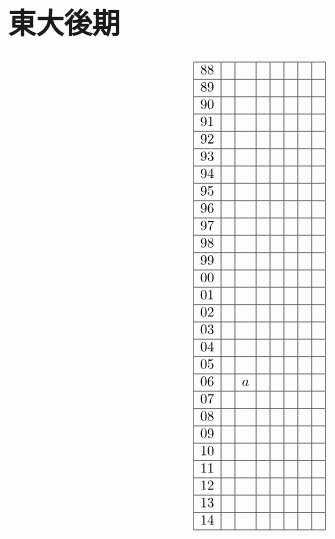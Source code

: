 \documentclass[a4j]{jarticle}
\begin{document}
\section{東大後期}
     \begin{align*}
          \begin{array}{|c|c|c|c|c|c|c|c|} \hline
          88&&&&&&& \\ \hline
          89&&&&&&& \\ \hline
          90&&&&&&& \\ \hline
          91&&&&&&& \\ \hline
          92&&&&&&& \\ \hline
          93&&&&&&& \\ \hline
          94&&&&&&& \\ \hline
          95&&&&&&& \\ \hline
          96&&&&&&& \\ \hline
          97&&&&&&& \\ \hline
          98&&&&&&& \\ \hline
          99&&&&&&& \\ \hline
          00&&&&&&& \\ \hline
          01&&&&&&& \\ \hline
          02&&&&&&& \\ \hline
          03&&&&&&& \\ \hline
          04&&&&&&& \\ \hline
          05&&&&&&& \\ \hline
          06&&a&&&&& \\ \hline
          07&&&&&&& \\ \hline
          08&&&&&&& \\ \hline
          09&&&&&&& \\ \hline
          10&&&&&&& \\ \hline
          11&&&&&&& \\ \hline
          12&&&&&&& \\ \hline
          13&&&&&&& \\ \hline
          14&&&&&&& \\ \hline
          \end{array}
     \end{align*}
\end{document}
